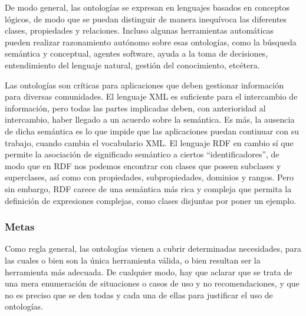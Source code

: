 		De modo general, las ontologías se expresan en lenguajes basados en conceptos lógicos, de modo que se puedan distinguir de manera inequívoca las diferentes clases, propiedades y relaciones. Incluso algunas herramientas automáticas pueden realizar razonamiento autónomo sobre esas ontologías, como la búsqueda semántica y conceptual, agentes software, ayuda a la toma de decisiones, entendimiento del lenguaje natural, gestión del conocimiento, etcétera.
      
		Las ontologías son críticas para aplicaciones que deben gestionar información para diversas comunidades. El lenguaje XML es suficiente para el intercambio de información, pero todas las partes implicadas deben, con anterioridad al intercambio, haber llegado a un acuerdo sobre la semántica. Es más, la ausencia de dicha semántica es lo que impide que las aplicaciones puedan continuar con su trabajo, cuando cambia el vocabulario XML. El lenguaje RDF en cambio sí que permite la asociación de significado semántico a ciertos "`identificadores"', de modo que en RDF nos podemos encontrar con clases que poseen subclases y superclases, así como con propiedades, subpropiedades, dominios y rangos. Pero sin embargo, RDF carece de una semántica más rica y compleja que permita la definición de expresiones complejas, como clases disjuntas por poner un ejemplo.
      
		\subsubsection{Metas}
		Como regla general, las ontologías vienen a cubrir determinadas necesidades, para las cuales o bien son la única herramienta válida, o bien resultan ser la herramienta más adecuada. De cualquier modo, hay que aclarar que se trata de una mera enumeración de situaciones o casos de uso y no recomendaciones, y que no es preciso que se den todas y cada una de ellas para justificar el uso de ontologías.
      
